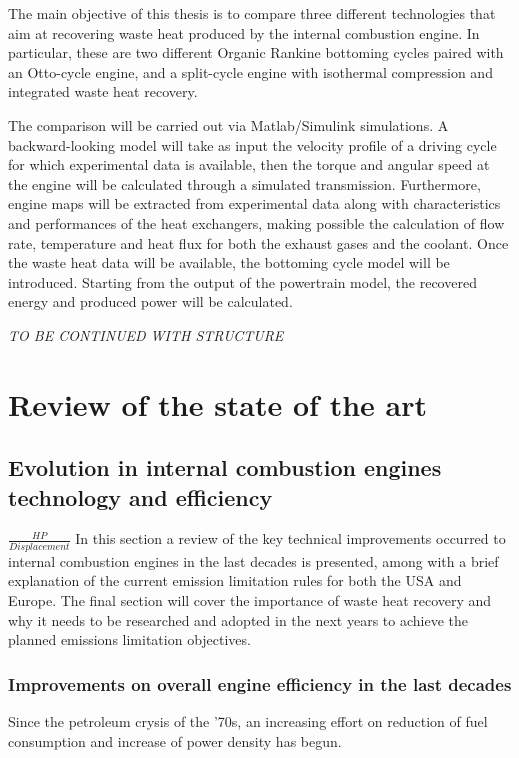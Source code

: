 \documentclass[12pt]{report}   %
\begin{document}
The main objective of this thesis is to compare three different technologies that aim at recovering waste heat produced by the internal combustion engine. In particular, these are two different Organic Rankine bottoming cycles paired with an Otto-cycle engine, and a split-cycle engine with isothermal compression and integrated waste heat recovery.

The comparison will be carried out via Matlab/Simulink simulations. A backward-looking model will take as input the velocity profile of a driving cycle for which experimental data is available, then the torque and angular speed at the engine will be calculated through a simulated transmission. Furthermore, engine maps will be extracted from experimental data along with characteristics and performances of the heat exchangers, making possible the calculation of flow rate, temperature and heat flux for both the exhaust gases and the coolant. Once the waste heat data will be available, the bottoming cycle model will be introduced. Starting from the output of the powertrain model, the recovered energy and produced power will be calculated.

\emph{TO BE CONTINUED WITH STRUCTURE}

\chapter{Review of the state of the art}

\section{Evolution in internal combustion engines technology and efficiency}
$\frac{HP}{Displacement}$
In this section a review of the key technical improvements occurred to internal combustion engines in the last decades is presented, among with a brief explanation of the current emission limitation rules for both the USA and Europe. The final section will cover the importance of waste heat recovery and why it needs to be researched and adopted in the next years to achieve the planned emissions limitation objectives.

\subsection{Improvements on overall engine efficiency in the last decades}

Since the petroleum crysis of the '70s, an increasing effort on reduction of fuel consumption and increase of power density has begun.
\end{document}
